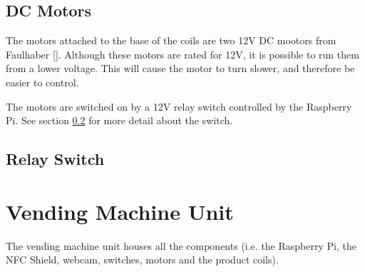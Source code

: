 \subsection{DC Motors}
\label{sec:dc-motor}

The motors attached to the base of the coils are two 12V DC mootors from Faulhaber
[\cite{website:dc-motors}]. Although these motors are rated for 12V, it is possible to run them
from a lower voltage. This will cause the motor to turn slower, and therefore be easier to
control. 

The motors are switched on by a 12V relay switch controlled by the Raspberry Pi. See section
\ref{sec:relay-switch} for more detail about the switch.

\subsection{Relay Switch}
\label{sec:relay-switch}

\section{Vending Machine Unit}

The vending machine unit houses all the components (i.e. the Raspberry Pi, the NFC Shield,
webcam, switches, motors and the product coils).